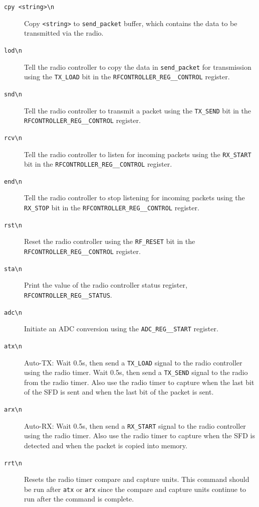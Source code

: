 \begin{description}
	\item[\texttt{cpy <string>\textbackslash n}] Copy \texttt{<string>} to \texttt{send\_packet} buffer, which contains the data to be transmitted via the radio. 
	\item[\texttt{lod\textbackslash n}] Tell the radio controller to copy the data in \texttt{send\_packet} for transmission using the \texttt{TX\_LOAD} bit in the \texttt{RFCONTROLLER\_REG\_\_CONTROL} register.
	\item[\texttt{snd\textbackslash n}] Tell the radio controller to transmit a packet using the \texttt{TX\_SEND} bit in the \texttt{RFCONTROLLER\_REG\_\_CONTROL} register.
	\item[\texttt{rcv\textbackslash n}] Tell the radio controller to listen for incoming packets using the \texttt{RX\_START} bit in the \texttt{RFCONTROLLER\_REG\_\_CONTROL} register.
	\item[\texttt{end\textbackslash n}] Tell the radio controller to stop listening for incoming packets using the \texttt{RX\_STOP} bit in the \texttt{RFCONTROLLER\_REG\_\_CONTROL} register. 
	\item[\texttt{rst\textbackslash n}] Reset the radio controller using the \texttt{RF\_RESET} bit in the \texttt{RFCONTROLLER\_REG\-\_\_CONTROL} register.
	\item[\texttt{sta\textbackslash n}] Print the value of the radio controller status register, \texttt{RFCONTROLLER\_REG\-\_\_STATUS}.
	\item[\texttt{adc\textbackslash n}] Initiate an ADC conversion using the \texttt{ADC\_REG\_\_START} register.
	\item[\texttt{atx\textbackslash n}] Auto-TX: Wait 0.5s, then send a \texttt{TX\_LOAD} signal to the radio controller using the radio timer. Wait 0.5s, then send a \texttt{TX\_SEND} signal to the radio from the radio timer. Also use the radio timer to capture when the last bit of the SFD is sent and when the last bit of the packet is sent.
	\item[\texttt{arx\textbackslash n}] Auto-RX: Wait 0.5s, then send a \texttt{RX\_START} signal to the radio controller using the radio timer. Also use the radio timer to capture when the SFD is detected and when the packet is copied into memory.
	\item[\texttt{rrt\textbackslash n}] Resets the radio timer compare and capture units. This command should be run after \texttt{atx} or \texttt{arx} since the compare and capture units continue to run after the command is complete. 
\end{description}

